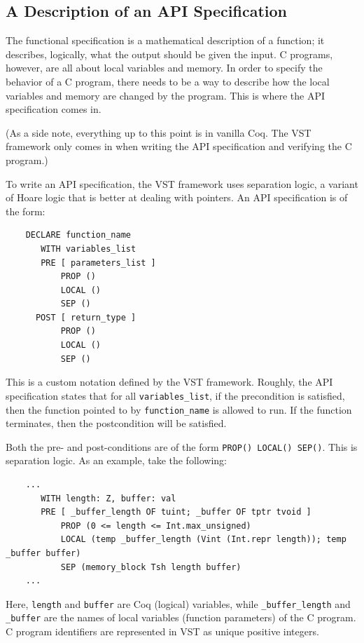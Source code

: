 \documentclass[pageno]{jpaper}
\begin{document}
\subsection{A Description of an API Specification}\label{api_spec}

The functional specification is a mathematical description of a function; it describes, logically, what the output should be given the input. C programs, however, are all about local variables and memory. In order to specify the behavior of a C program, there needs to be a way to describe how the local variables and memory are changed by the program. This is where the API specification comes in.

(As a side note, everything up to this point is in vanilla Coq. The VST framework only comes in when writing the API specification and verifying the C program.)

To write an API specification, the VST framework uses separation logic, a variant of Hoare logic that is better at dealing with pointers. An API specification is of the form:

\begin{lstlisting}
    DECLARE function_name
       WITH variables_list
       PRE [ parameters_list ]
           PROP ()
           LOCAL ()
           SEP ()
      POST [ return_type ]
           PROP ()
           LOCAL ()
           SEP ()
\end{lstlisting}

This is a custom notation defined by the VST framework. Roughly, the API specification states that for all \lstinline{variables_list}, if the precondition is satisfied, then the function pointed to by \lstinline{function_name} is allowed to run. If the function terminates, then the postcondition will be satisfied.

Both the pre- and post-conditions are of the form \lstinline{PROP() LOCAL() SEP()}. This is separation logic. As an example, take the following:

\begin{lstlisting}
    ...
       WITH length: Z, buffer: val
       PRE [ _buffer_length OF tuint; _buffer OF tptr tvoid ]
           PROP (0 <= length <= Int.max_unsigned)
           LOCAL (temp _buffer_length (Vint (Int.repr length)); temp _buffer buffer)
           SEP (memory_block Tsh length buffer)
    ...
\end{lstlisting}


Here, \lstinline{length} and \lstinline{buffer} are Coq (logical) variables, while \lstinline{_buffer_length} and \lstinline{_buffer} are the names of local variables (function parameters) of the C program. C program identifiers are represented in VST as unique positive integers.
\end{document}
